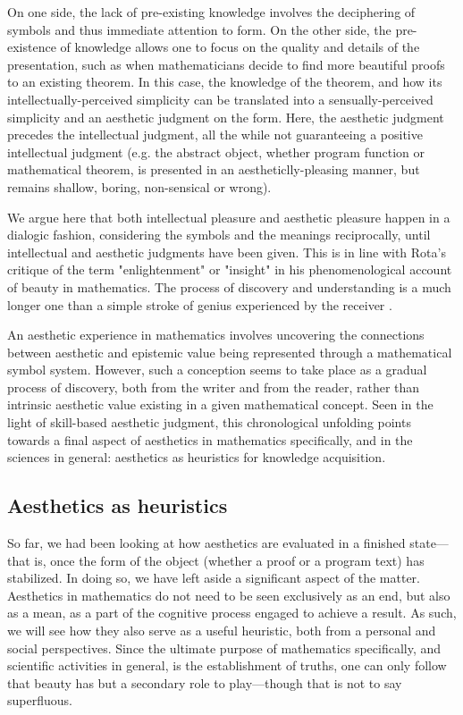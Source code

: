 On one side, the lack of pre-existing knowledge involves the deciphering of symbols and thus immediate attention to form. On the other side, the pre-existence of knowledge allows one to focus on the quality and details of the presentation, such as when mathematicians decide to find more beautiful proofs to an existing theorem. In this case, the knowledge of the theorem, and how its intellectually-perceived simplicity can be translated into a sensually-perceived simplicity and an aesthetic judgment on the form. Here, the aesthetic judgment precedes the intellectual judgment, all the while not guaranteeing a positive intellectual judgment (e.g. the abstract object, whether program function or mathematical theorem, is presented in an aestheticlly-pleasing manner, but remains shallow, boring, non-sensical or wrong).

We argue here that both intellectual pleasure and aesthetic pleasure happen in a dialogic fashion, considering the symbols and the meanings reciprocally, until intellectual and aesthetic judgments have been given. This is in line with Rota's critique of the term "enlightenment" or "insight" in his phenomenological account of beauty in mathematics. The process of discovery and understanding is a much longer one than a simple stroke of genius experienced by the receiver \citep{rota_phenomenology_1997}.

An aesthetic experience in mathematics involves uncovering the connections between aesthetic and epistemic value being represented through a mathematical symbol system. However, such a conception seems to take place as a gradual process of discovery, both from the writer and from the reader, rather than intrinsic aesthetic value existing in a given mathematical concept. Seen in the light of skill-based aesthetic judgment, this chronological unfolding points towards a final aspect of aesthetics in mathematics specifically, and in the sciences in general: aesthetics as heuristics for knowledge acquisition.

\subsection{Aesthetics as heuristics}
\label{subsec:aesthetics-heuristics}

So far, we had been looking at how aesthetics are evaluated in a finished state—that is, once the form of the object (whether a proof or a program text) has stabilized. In doing so, we have left aside a significant aspect of the matter. Aesthetics in mathematics do not need to be seen exclusively as an end, but also as a mean, as a part of the cognitive process engaged to achieve a result. As such, we will see how they also serve as a useful heuristic, both from a personal and social perspectives. Since the ultimate purpose of mathematics specifically, and scientific activities in general, is the establishment of truths, one can only follow that beauty has but a secondary role to play—though that is not to say superfluous.

